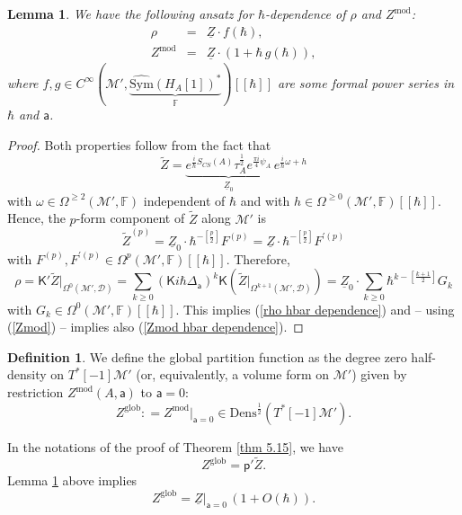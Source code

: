 \documentclass[11pt,a4paper]{amsart}
\theoremstyle{plain} %
\newtheorem{lem}[thm]{Lemma}
\theoremstyle{definition}
\newtheorem{defn}[thm]{Definition}
\theoremstyle{remark}
\newcommand{\mr}{\mathrm}
\newcommand{\sfa}{\mathsf{a}}
\newcommand{\M}{\mathcal{M}}
\newcommand{\wh}{\widehat}
\newcommand{\til}{\widetilde}
\newcommand{\mc}{\mathcal}
\newcommand{\ul}{\underline}
\begin{document}
\begin{lem}\label{lem Zmod = Z (1+O(hbar))}
    We have the following ansatz for $\hbar$-dependence of $\rho$ and $Z^\mr{mod}$: %
    \begin{eqnarray}
        \rho&=&\ul{Z}\cdot f(\hbar), \label{rho hbar dependence}\\
        Z^\mr{mod}&=&\ul{Z}\cdot (1+\hbar\, g(\hbar)), \label{Zmod hbar dependence}
    \end{eqnarray}
    where $f,g\in C^\infty(\M',\underbrace{\wh{\mr{Sym}}(H_A[1])^*}_{\mathbb{F}})[[\hbar]]$ are some formal power series in $\hbar$ and $\sfa$.
\end{lem}
\begin{proof}
    Both properties follow from the fact that 
    \begin{equation}
    \til{Z}=\underbrace{e^{\frac{i}{\hbar}S_{CS}(A)}\tau_A^{\frac12}e^{\frac{\pi i}{4}\psi_A}}_{\ul{Z}_0}\,e^{\frac{i}{\hbar}\omega+h}
    \end{equation} 
    with $\omega\in \Omega^{\geq 2}(\M',\mathbb{F})$ independent of $\hbar$ and with $h\in \Omega^{\geq 0}(\M',\mathbb{F})[[\hbar]]$. Hence, the $p$-form component of $\til{Z}$ along $\M'$ is
    \begin{equation}
        \til{Z}^{(p)}=\ul{Z}_0\cdot \hbar^{-\left[\frac{p}{2}\right]}F^{(p)}=\ul{Z}\cdot \hbar^{-\left[\frac{p}{2}\right]}F^{'(p)}
    \end{equation}
    with $F^{(p)},F^{'(p)}\in \Omega^p(\M',\mathbb{F})[[\hbar]]$. Therefore,
    \begin{equation}
        \rho=\mathsf{K}'\til{Z}\big|_{\Omega^0(\M',\mc{D})}=\sum_{k\geq 0}(\mathsf{K} i\hbar \Delta_\sfa)^k \mathsf{K}\left(\til{Z}|_{\Omega^{k+1}(\M',\mc{D})}\right)=
        \ul{Z}_0 \cdot \sum_{k\geq 0}\hbar^{k-\left[\frac{k+1}{2}\right]}G_k
    \end{equation}
    with $G_k\in \Omega^0(\M',\mathbb{F})[[\hbar]]$. This implies (\ref{rho hbar dependence}) and -- using (\ref{Zmod}) -- implies also (\ref{Zmod hbar dependence}).
\end{proof}

\begin{defn}
    We define the global partition function as the degree zero half-density on $T^*[-1]\M'$ (or, equivalently, a volume form on $\M'$) given by restriction $Z^\mr{mod}(A,\sfa)$ to $\sfa=0$:
    \begin{equation}
    Z^\mr{glob}\colon= Z^\mr{mod}\Big|_{\sfa=0} \in \mr{Dens}^{\frac12}(T^*[-1]\M').
    \end{equation}
\end{defn}
In the notations of the proof of Theorem \ref{thm 5.15}, we have 
\begin{equation}
Z^\mr{glob}=\mathsf{p}'\til{Z}. 
\end{equation}
Lemma \ref{lem Zmod = Z (1+O(hbar))} above implies
    \begin{equation}
        Z^\mr{glob}=\ul{Z}\big|_{\sfa=0}\,(1+O(\hbar)).
    \end{equation}
\end{document}

